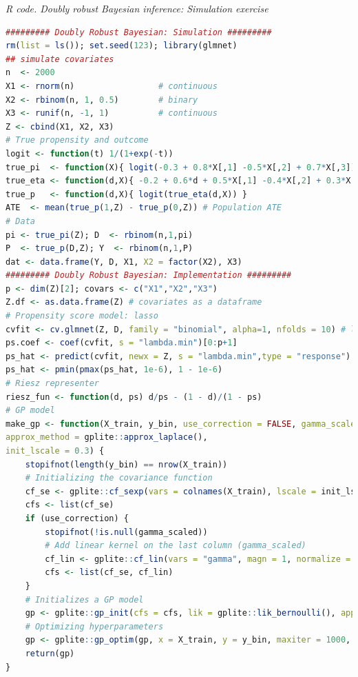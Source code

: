 \begin{tcolorbox}[enhanced,width=4.67in,center upper,
	fontupper=\large\bfseries,drop shadow southwest,sharp corners]
	\textit{R code. Doubly robust Bayesian inference: Simulation exercise}
	\begin{VF}
		\begin{lstlisting}[language=R]	
######### Doubly Robust Bayesian: Simulation #########
rm(list = ls()); set.seed(123); library(glmnet)
## simulate covariates
n  <- 2000
X1 <- rnorm(n)                 # continuous
X2 <- rbinom(n, 1, 0.5)        # binary
X3 <- runif(n, -1, 1)          # continuous
Z <- cbind(X1, X2, X3)
# True propensity and outcome
logit <- function(t) 1/(1+exp(-t))
true_pi  <- function(X){ logit(-0.3 + 0.8*X[,1] -0.5*X[,2] + 0.7*X[,3]) }
true_eta <- function(d,X){ -0.2 + 0.6*d + 0.5*X[,1] -0.4*X[,2] + 0.3*X[,3] }
true_p   <- function(d,X){ logit(true_eta(d,X)) }
ATE  <- mean(true_p(1,Z) - true_p(0,Z)) # Population ATE
# Data
pi <- true_pi(Z); D  <- rbinom(n,1,pi)
P  <- true_p(D,Z); Y  <- rbinom(n,1,P)
dat <- data.frame(Y, D, X1, X2 = factor(X2), X3)
######### Doubly Robust Bayesian: Implementation #########
p <- dim(Z)[2]; covars <- c("X1","X2","X3")
Z.df <- as.data.frame(Z) # covariates as a dataframe
# Propensity score model: lasso
cvfit <- cv.glmnet(Z, D, family = "binomial", alpha=1, nfolds = 10) # lasso,min
ps.coef <- coef(cvfit, s = "lambda.min")[0:p+1]
ps_hat <- predict(cvfit, newx = Z, s = "lambda.min",type = "response")
ps_hat <- pmin(pmax(ps_hat, 1e-6), 1 - 1e-6)
# Riesz representer
riesz_fun <- function(d, ps) d/ps - (1 - d)/(1 - ps)
# GP model
make_gp <- function(X_train, y_bin, use_correction = FALSE, gamma_scaled = NULL,
approx_method = gplite::approx_laplace(),
init_lscale = 0.3) {
	stopifnot(length(y_bin) == nrow(X_train))
	# Initializing the covariance function
	cf_se <- gplite::cf_sexp(vars = colnames(X_train), lscale = init_lscale, magn = 1, normalize = TRUE)
	cfs <- list(cf_se)
	if (use_correction) {
		stopifnot(!is.null(gamma_scaled))
		# Add linear kernel on the last column (gamma_scaled)
		cf_lin <- gplite::cf_lin(vars = "gamma", magn = 1, normalize = FALSE)
		cfs <- list(cf_se, cf_lin)
	}
	# Initializes a GP model
	gp <- gplite::gp_init(cfs = cfs, lik = gplite::lik_bernoulli(), approx = approx_method)
	# Optimizing hyperparameters
	gp <- gplite::gp_optim(gp, x = X_train, y = y_bin, maxiter = 1000, restarts = 3, tol = 1e-05)
	return(gp)
}
\end{lstlisting}
\end{VF}
\end{tcolorbox} 

